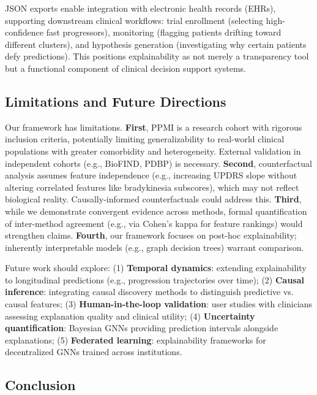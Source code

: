 JSON exports enable integration with electronic health records (EHRs), supporting downstream clinical workflows: trial enrollment (selecting high-confidence fast progressors), monitoring (flagging patients drifting toward different clusters), and hypothesis generation (investigating why certain patients defy predictions). This positions explainability as not merely a transparency tool but a functional component of clinical decision support systems\cite{shortliffe2001biomedical}.

\subsection{Limitations and Future Directions}

Our framework has limitations. \textbf{First}, PPMI is a research cohort with rigorous inclusion criteria, potentially limiting generalizability to real-world clinical populations with greater comorbidity and heterogeneity. External validation in independent cohorts (e.g., BioFIND, PDBP)\cite{kang2016biofind,rosenthal2016pd} is necessary. \textbf{Second}, counterfactual analysis assumes feature independence (e.g., increasing UPDRS slope without altering correlated features like bradykinesia subscores), which may not reflect biological reality. Causally-informed counterfactuals\cite{pearl2018book} could address this. \textbf{Third}, while we demonstrate convergent evidence across methods, formal quantification of inter-method agreement (e.g., via Cohen's kappa for feature rankings) would strengthen claims. \textbf{Fourth}, our framework focuses on post-hoc explainability; inherently interpretable models (e.g., graph decision trees\cite{wu2020graph}) warrant comparison.

Future work should explore: (1) \textbf{Temporal dynamics}: extending explainability to longitudinal predictions (e.g., progression trajectories over time); (2) \textbf{Causal inference}: integrating causal discovery methods\cite{scholkopf2019causality} to distinguish predictive vs. causal features; (3) \textbf{Human-in-the-loop validation}: user studies with clinicians assessing explanation quality and clinical utility\cite{miller2019explanation}; (4) \textbf{Uncertainty quantification}: Bayesian GNNs\cite{zhang2019bayesian} providing prediction intervals alongside explanations; (5) \textbf{Federated learning}: explainability frameworks for decentralized GNNs trained across institutions\cite{rieke2020future}.

\subsection{Conclusion}


